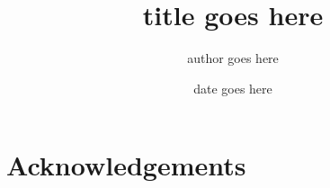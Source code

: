 \documentclass[12pt,a4paper]{report}
\begin{document}
\title{title goes here}
\author{author goes here}
\date{date goes here}
\maketitle

\tableofcontents
\listoffigures
\listoftables

\chapter*{Acknowledgements}










\end{document}
